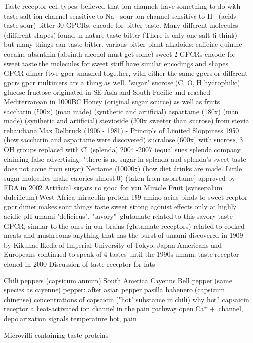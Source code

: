 \documentclass{article}
\begin{document}
Taste receptor cell types: 
    believed that ion channels have something to do with taste
    salt
        ion channel sensitive to Na$^+$    
    sour
        ion channel sensitive to H$^+$ (acids taste sour)
    bitter
        30 GPCRs, encode for bitter taste. 
        Many different molecules (different shapes) found in nature taste bitter 
        (There is only one salt (i think) but many things can taste bitter. various bitter plant alkaloids: 
            caffeine
            quinine
            cocaine
            absinthin (absinth alcohol must get some)
    sweet
        2 GPCRs encode for sweet taste
        the molecules for sweet stuff have similar encodings and shapes
        GPCR dimer (two gpcr smashed together, with either the same gpcrs or different gpcrs
        gpcr multimers are a thing as well. 
        "sugar"
            sucrose (C, O, H hydrophilic)
            glucose
            fructose
            originated in SE Asia and South Pacific and reached Mediterranean in 1000BC
            Honey (original sugar source) as well as fruits
            saccharin (500x) (man made) (synthetic and artificial)
            aspartame (180x) (man made) (synthetic and artificial)
            stevioside (300x sweeter than sucrose) from stevia rebaudiana
            Max Delbruck (1906 - 1981) - Principle of Limited Sloppiness 1950 (how saccharin and aspartame were discovered)
            sucralose (600x) with sucrose, 3 OH groups replaced with Cl (splenda)
                2004 -2007 (equal sues splenda company, claiming false advertising: "there is no sugar in splenda and splenda's sweet taste does not come from sugar)
            Neotame (10000x) (how diet drinks are made. Little sugar molecules make calories almost 0) (taken from aspartame) approved by FDA in 2002
        Artificial sugars no good for you
        Miracle Fruit (synsepalum dulcificum) West Africa
            miraculin protein 199 amino acids
            binds to sweet reeptor gpcr dimer
            makes sour things taste sweet
            strong agonist effects only at highly acidic pH
    umami 
        "delicious", "savory", glutamate related to this savory taste
        GPCR, similar to the ones in our brains (glutamate receptors)
        related to cooked meats and mushrooms anything that has the burst of umami
        discovered in 1909 by Kikunae Ikeda of Imperial University of Tokyo, Japan
        Americans and Europeans continued to speak of 4 tastes until the 1990s
        umami taste receptor cloned in 2000
    Discussion of taste receptor for fats
    
    Chili peppers (capsicum annum) South America
        Cayenne
        Bell pepper (same species as cayenne)
            pepper: after asian pepper
        pasilla
        habenero (capsicum chinense)
        concentrations of capsaicin ("hot" substance in chili)
            why hot?
            capsaicin receptor a heat-activated ion channel in the pain pathway
            open Ca$^++$ channel, depolarization
            signals temperature hot, pain
            
            
Microvilli containing taste proteins
 
    
\end{document}
